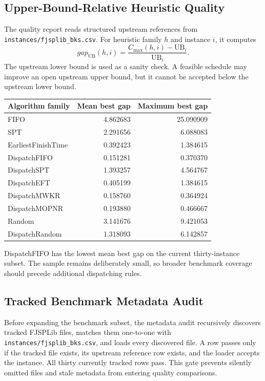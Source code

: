 ﻿\documentclass[11pt]{article}
\begin{document}
\clearpage
\subsection{Upper-Bound-Relative Heuristic Quality}

The quality report reads structured upstream references from
\texttt{instances/fjsplib\_bks.csv}. For heuristic family $h$ and instance
$i$, it computes
\[
gap_{\mathrm{UB}}(h,i)
= \frac{C_{\max}(h,i)-\mathrm{UB}_i}{\mathrm{UB}_i}.
\]
The upstream lower bound is used as a sanity check. A feasible schedule may
improve an open upstream upper bound, but it cannot be accepted below the
upstream lower bound.

\begin{table}[h]
\centering
\begin{tabular}{lrr}
\toprule
Algorithm family & Mean best gap & Maximum best gap \\
\midrule
FIFO & 4.862683 & 25.090909 \\
SPT & 2.291656 & 6.088083 \\
EarliestFinishTime & 0.392423 & 1.384615 \\
DispatchFIFO & 0.151281 & 0.370370 \\
DispatchSPT & 1.393257 & 4.564767 \\
DispatchEFT & 0.405199 & 1.384615 \\
DispatchMWKR & 0.158760 & 0.364924 \\
DispatchMOPNR & 0.193880 & 0.466667 \\
Random & 3.141676 & 9.421053 \\
DispatchRandom & 1.318093 & 6.142857 \\
\bottomrule
\end{tabular}
\end{table}

DispatchFIFO has the lowest mean best gap on the current thirty-instance subset.
The sample remains deliberately small, so broader benchmark coverage should
precede additional dispatching rules.

\clearpage
\subsection{Tracked Benchmark Metadata Audit}

Before expanding the benchmark subset, the metadata audit recursively
discovers tracked FJSPLib files, matches them one-to-one with
\texttt{instances/fjsplib\_bks.csv}, and loads every discovered file. A row
passes only if the tracked file exists, its upstream reference row exists, and
the loader accepts the instance. All thirty currently tracked rows pass. This
gate prevents silently omitted files and stale metadata from entering quality
comparisons.
\end{document}
